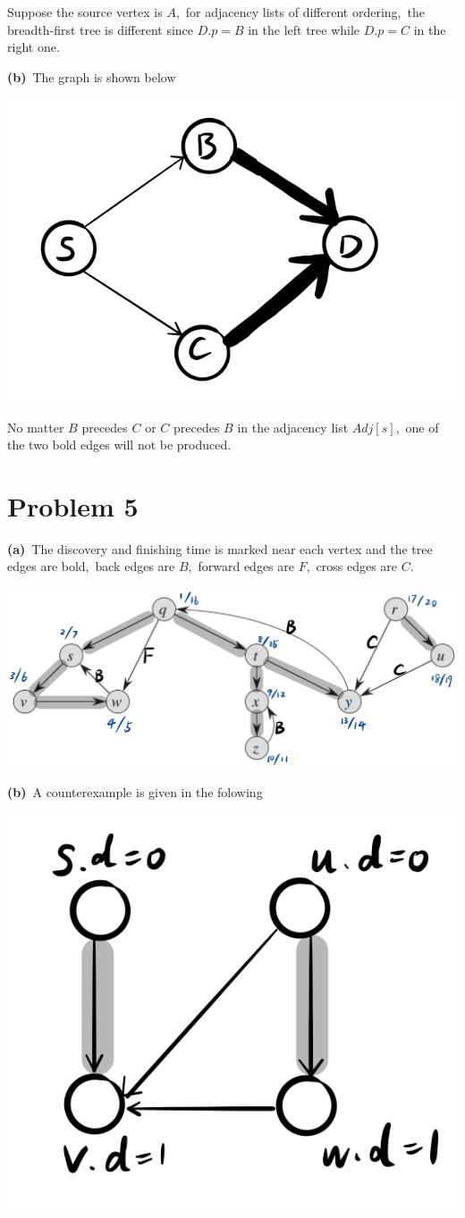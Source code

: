 \documentclass[]{article}
\begin{document}
	Suppose the source vertex is $A$,\ for adjacency lists of different ordering,\ the breadth-first tree is different since $D.p = B$ in the left tree while $D.p = C$ in the right one.
	
	\textbf{(b)}\ The graph is shown below
	
	\includegraphics[width=.5\textwidth]{2.png}
	
	No matter $B$ precedes $C$ or $C$ precedes $B$ in the adjacency list $Adj[s]$,\ one of the two bold edges will not be produced.
	
	\section{Problem 5}
	\textbf{(a)}\ The discovery and finishing time is marked near each vertex and the tree edges are bold,\ back edges are $B$,\ forward edges are $F$,\ cross edges are $C$.
	
	\includegraphics[width=.9\textwidth]{3.png} 
	
	\textbf{(b)}\ A counterexample is given in the folowing

    \includegraphics[width=.5\textwidth]{4.png}
    
\end{document}
